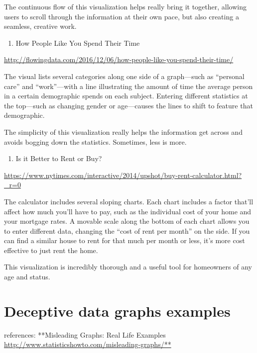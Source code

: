 \documentclass[]{book}
\providecommand{\tightlist}{%
  \setlength{\itemsep}{0pt}\setlength{\parskip}{0pt}}
\theoremstyle{definition}
\theoremstyle{definition}
\theoremstyle{definition}
\theoremstyle{remark}
\begin{document}
The continuous flow of this visualization helps really bring it
together, allowing users to scroll through the information at their own
pace, but also creating a seamless, creative work.

\begin{enumerate}
\def\labelenumi{\arabic{enumi}.}
\setcounter{enumi}{3}
\tightlist
\item
  How People Like You Spend Their Time
\end{enumerate}

\url{http://flowingdata.com/2016/12/06/how-people-like-you-spend-their-time/}

The visual lists several categories along one side of a graph---such as
``personal care'' and ``work''---with a line illustrating the amount of
time the average person in a certain demographic spends on each subject.
Entering different statistics at the top---such as changing gender or
age---causes the lines to shift to feature that demographic.

The simplicity of this visualization really helps the information get
across and avoids bogging down the statistics. Sometimes, less is more.

\begin{enumerate}
\def\labelenumi{\arabic{enumi}.}
\setcounter{enumi}{4}
\tightlist
\item
  Is it Better to Rent or Buy?
\end{enumerate}

\url{https://www.nytimes.com/interactive/2014/upshot/buy-rent-calculator.html?_r=0}

The calculator includes several sloping charts. Each chart includes a
factor that'll affect how much you'll have to pay, such as the
individual cost of your home and your mortgage rates. A movable scale
along the bottom of each chart allows you to enter different data,
changing the ``cost of rent per month'' on the side. If you can find a
similar house to rent for that much per month or less, it's more cost
effective to just rent the home.

This visualization is incredibly thorough and a useful tool for
homeowners of any age and status.

\section{Deceptive data graphs
examples}\label{deceptive-data-graphs-examples}

references: **Misleading Graphs: Real Life Examples
\url{http://www.statisticshowto.com/misleading-graphs/**}
\end{document}
